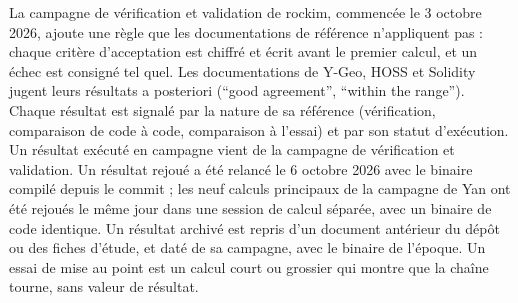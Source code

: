 La campagne de vérification et validation de rockim, commencée le 3 octobre 2026, ajoute une règle que les documentations de référence n'appliquent pas : chaque critère d'acceptation est chiffré et écrit avant le premier calcul, et un échec est consigné tel quel. Les documentations de Y-Geo, HOSS et Solidity jugent leurs résultats a posteriori (\enquote{good agreement}, \enquote{within the range}). Chaque résultat est signalé par la nature de sa référence (vérification, comparaison de code à code, comparaison à l'essai) et par son statut d'exécution. Un résultat exécuté en campagne vient de la campagne de vérification et validation. Un résultat rejoué a été relancé le 6 octobre 2026 avec le binaire compilé depuis le commit  ; les neuf calculs principaux de la campagne de Yan ont été rejoués le même jour dans une session de calcul séparée, avec un binaire de code identique. Un résultat archivé est repris d'un document antérieur du dépôt ou des fiches d'étude, et daté de sa campagne, avec le binaire de l'époque. Un essai de mise au point est un calcul court ou grossier qui montre que la chaîne tourne, sans valeur de résultat.
